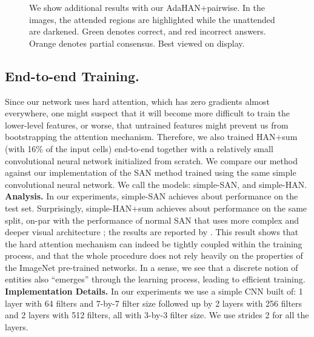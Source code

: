 \begin{figure*}[p]
\begin{center}
\begin{tabular}{l@{\ }l@{\ }c@{\ }c@{\ }c@{\ }c}
\end{tabular}
\end{center}
\caption{
We show additional results with our AdaHAN+pairwise. In the images, the attended regions are highlighted while the unattended are darkened. Green denotes correct, and red incorrect answers. Orange denotes partial consensus. Best viewed on display.
}
\label{fig:qualitative2}
\end{figure*}

\def\arraystretch{1.2}


\subsection{End-to-end Training.}
\label{sec:end2end_training}
Since our network uses hard attention, which has zero gradients almost everywhere, one might suspect that it will become more difficult to train the lower-level features, or worse, that untrained features might prevent us from bootstrapping the attention mechanism.
Therefore, we also trained HAN+sum (with 16\% of the input cells) end-to-end together with a relatively small convolutional neural network initialized from scratch.  
We compare our method against our implementation of the SAN method trained using the same simple convolutional neural network. 
We call the models: simple-SAN, and simple-HAN.
\newline
\noindent \textbf{Analysis.}
In our experiments, simple-SAN achieves about  performance on the test set. Surprisingly, simple-HAN+sum achieves about  performance on the same split, on-par with the performance of normal SAN that uses more complex and deeper visual architecture \cite{simonyan2014very}; the results are reported by \cite{agrawal2017don}. This result shows that the hard attention mechanism can indeed be tightly coupled within the training process, and that the whole procedure does not rely heavily on the properties of the ImageNet pre-trained networks.
In a sense, we see that a discrete notion of entities also ``emerges'' through the learning process, leading to efficient training.
\newline
\noindent \textbf{Implementation Details.}
In our experiments we use a simple CNN built of: 1 layer with 64 filters and 7-by-7 filter size followed up by 2 layers with 256 filters and 2 layers with 512 filters, all with 3-by-3 filter size. We use strides 2 for all the layers. 
